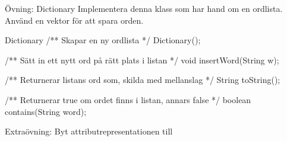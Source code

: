 \documentclass{lecturenotes}
\begin{document}
\begin{Slide}{Övning: Dictionary}\footnotesize
Implementera denna klass som har hand om en ordlista. \\Använd en vektor  för att spara orden.
\begin{ClassSpec}{Dictionary}
/** Skapar en ny ordlista */
Dictionary();

/** Sätt in ett nytt ord på rätt plats i listan */
void insertWord(String w);

/** Returnerar listans ord som, skilda med mellanslag */
String toString();

/** Returnerar true om ordet finns i listan, annars false */
boolean contains(String word);
\end{ClassSpec}
\vspace{1em}
Extraövning: Byt attributrepresentationen till 
\end{Slide}
\end{document}
